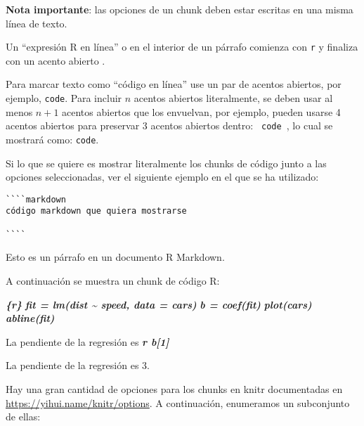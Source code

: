 \documentclass[12pt,a4paper,]{book}
\newenvironment{Shaded}{\begin{snugshade}}{\end{snugshade}}
\newcommand{\InformationTok}[1]{\textcolor[rgb]{0.56,0.35,0.01}{\textbf{\textit{#1}}}}
\newcommand{\NormalTok}[1]{#1}
\numberwithin{dummy}{section}
\theoremstyle{ocrenumbox}
\theoremstyle{blacknumex}
\theoremstyle{blacknumbox}
\theoremstyle{ocrenum}
\theoremstyle{ocrenum}
\begin{document}
\textbf{Nota importante}: las opciones de un chunk deben estar escritas
en una misma línea de texto.

Un ``expresión R en línea'' o en el interior de un párrafo comienza con
\texttt{\textasciigrave{}r} y finaliza con un acento abierto
\texttt{\textasciigrave{}}.

Para marcar texto como ``código en línea'' use un par de acentos
abiertos, por ejemplo, \texttt{\textasciigrave{}code\textasciigrave{}}.
Para incluir \(n\) acentos abiertos literalmente, se deben usar al menos
\(n+1\) acentos abiertos que los envuelvan, por ejemplo, pueden usarse 4
acentos abiertos para preservar 3 acentos abiertos dentro:
\texttt{\textasciigrave{}\textasciigrave{}\textasciigrave{}\textasciigrave{}\ \textasciigrave{}\textasciigrave{}\textasciigrave{}code\textasciigrave{}\textasciigrave{}\textasciigrave{}\ \textasciigrave{}\textasciigrave{}\textasciigrave{}\textasciigrave{}},
lo cual se mostrará como:
\texttt{\textasciigrave{}\textasciigrave{}\textasciigrave{}code\textasciigrave{}\textasciigrave{}\textasciigrave{}}.

Si lo que se quiere es mostrar literalmente los chunks de código junto a
las opciones seleccionadas, ver el siguiente ejemplo en el que se ha
utilizado:

\begin{verbatim}
````markdown
código markdown que quiera mostrarse

````
\end{verbatim}

\begin{Shaded}
\begin{Highlighting}[]
\NormalTok{Esto es un párrafo en un documento R Markdown.}

\NormalTok{A continuación se muestra un chunk de código R:}

\InformationTok{\textasciigrave{}\textasciigrave{}\textasciigrave{}\{r\}}
\InformationTok{fit = lm(dist \textasciitilde{} speed, data = cars)}
\InformationTok{b   = coef(fit)}
\InformationTok{plot(cars)}
\InformationTok{abline(fit)}
\InformationTok{\textasciigrave{}\textasciigrave{}\textasciigrave{}}

\NormalTok{La pendiente de la regresión es }\InformationTok{\textasciigrave{}r b[1]\textasciigrave{}}
\end{Highlighting}
\end{Shaded}

La pendiente de la regresión es 3.

Hay una gran cantidad de opciones para los chunks en knitr documentadas
en \url{https://yihui.name/knitr/options}. A continuación, enumeramos un
subconjunto de ellas:
\end{document}
